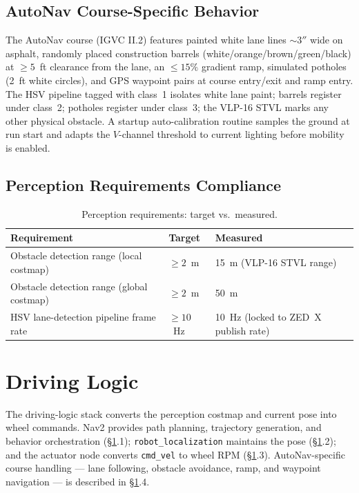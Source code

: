 \documentclass[12pt, letterpaper]{article}
\begin{document}
\subsection{AutoNav Course-Specific Behavior}

The AutoNav course (IGVC II.2) features painted white lane lines $\sim 3''$ wide on
asphalt, randomly placed construction barrels (white/orange/brown/green/black) at
$\geq 5$~ft clearance from the lane, an $\leq 15\%$ gradient ramp, simulated potholes
(2~ft white circles), and GPS waypoint pairs at course entry/exit and ramp entry. The
HSV pipeline tagged with class~1 isolates white lane paint; barrels register under
class~2; potholes register under class~3; the VLP-16 STVL marks any other physical
obstacle. A startup auto-calibration routine samples the ground at run start and adapts
the $V$-channel threshold to current lighting before mobility is enabled.

\subsection{Perception Requirements Compliance}

\begin{table}[H]
    \centering
    \small
    \caption{Perception requirements: target vs.\ measured.}
    \begin{tabularx}{\textwidth}{X l l}
        \toprule
        \textbf{Requirement} & \textbf{Target} & \textbf{Measured} \\
        \midrule
        Obstacle detection range (local costmap)   & $\geq 2$~m  & 15~m (VLP-16 STVL range) \\
        Obstacle detection range (global costmap)  & $\geq 2$~m  & 50~m \\
        HSV lane-detection pipeline frame rate     & $\geq 10$~Hz & 10~Hz (locked to ZED~X publish rate) \\
        \bottomrule
    \end{tabularx}
\end{table}

\section{Driving Logic}
\label{sec:drivinglogic}

The driving-logic stack converts the perception costmap and current pose into wheel
commands. Nav2 provides path planning, trajectory generation, and behavior orchestration
(\S\ref{sec:drivinglogic}.1); \texttt{robot\_localization} maintains the pose
(\S\ref{sec:drivinglogic}.2); and the actuator node converts \texttt{cmd\_vel} to wheel
RPM (\S\ref{sec:drivinglogic}.3). AutoNav-specific course handling --- lane following,
obstacle avoidance, ramp, and waypoint navigation --- is described in
\S\ref{sec:drivinglogic}.4.
\end{document}
